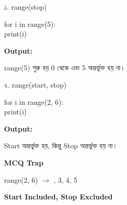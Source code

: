 \noindent
\begin{minipage}[t]{0.49\linewidth}

\begin{sideexamplebox}{১. \textenglish{\ttfamily range(stop)}}

\begin{sidecodebox}
\begin{english}
\ttfamily
for i in range(5):\\
\hspace*{4mm}print(i)
\end{english}
\end{sidecodebox}

\textbf{Output:}

\begin{center}
\textenglish{    }
\end{center}

\textenglish{\ttfamily range(5)}
শুরু হয় 0 থেকে এবং 5 অন্তর্ভুক্ত হয় না।

\end{sideexamplebox}

\end{minipage}
\hfill
\begin{minipage}[t]{0.49\linewidth}

\begin{sideexamplebox}{২. \textenglish{\ttfamily range(start, stop)}}

\begin{sidecodebox}
\begin{english}
\ttfamily
for i in range(2, 6):\\
\hspace*{4mm}print(i)
\end{english}
\end{sidecodebox}

\textbf{Output:}

\begin{center}
\textenglish{   }
\end{center}

Start অন্তর্ভুক্ত হয়, কিন্তু Stop অন্তর্ভুক্ত হয় না।

\end{sideexamplebox}

\end{minipage}

\begin{rememberbox}

\textbf{\color{deepOrange}MCQ Trap}

\begin{center}

\textenglish{\ttfamily range(2, 6)}
\(\longrightarrow\)
\textenglish{, 3, 4, 5}

\end{center}

\textbf{Start Included, Stop Excluded}

\end{rememberbox}

